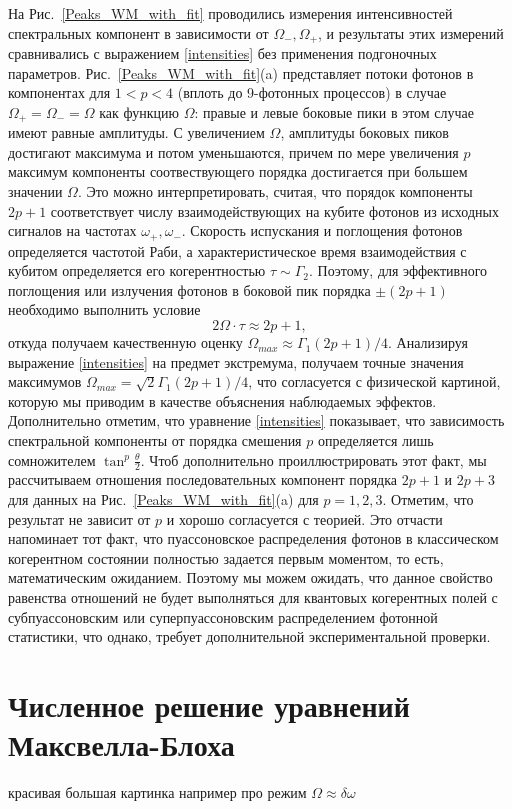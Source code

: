 На Рис.~\ref{Peaks_WM_with_fit} проводились измерения интенсивностей спектральных компонент в зависимости от $\Omega_-, \Omega_+$, и результаты этих измерений сравнивались с выражением \eqref{intensities} без применения подгоночных параметров. Рис.~\ref{Peaks_WM_with_fit}(a) представляет потоки фотонов в компонентах для  $1< p < 4$ (вплоть до 9-фотонных процессов) в случае $\Omega_+\!=\!\Omega_-\!=\!\Omega$ как функцию $\Omega$: правые и левые боковые пики в этом случае имеют равные амплитуды. С увеличением $\Omega$, амплитуды боковых пиков достигают максимума и потом уменьшаются, причем по мере увеличения $p$ максимум компоненты соотвествующего порядка достигается при большем значении $\Omega$. Это можно интерпретировать, считая, что порядок компоненты $2p + 1$ соответствует числу взаимодействующих на кубите фотонов из исходных сигналов на частотах $\omega_+, \omega_-$. Скорость испускания и поглощения фотонов определяется частотой Раби, а характеристическое время взаимодействия с кубитом определяется его когерентностью $\tau \sim \Gamma_2$. Поэтому, для эффективного поглощения или излучения фотонов в боковой пик порядка $\pm(2p+1)$ необходимо выполнить условие
\begin{equation}
2\Omega\cdot \tau \approx 2p+1,
\end{equation}
откуда получаем качественную оценку $\Omega_{max} \approx \Gamma_1(2p+1)/4$. Анализируя выражение \eqref{intensities} на предмет экстремума, получаем точные значения максимумов $\Omega_{max} = \sqrt{2} \Gamma_1(2p+1)/4$, что согласуется с физической картиной, которую мы приводим в качестве объяснения наблюдаемых эффектов. Дополнительно отметим, что уравнение \eqref{intensities} показывает, что зависимость спектральной компоненты от порядка смешения $p$ определяется лишь сомножителем $\tan^p\frac{\theta}{2}$. Чтоб дополнительно проиллюстрировать этот факт, мы рассчитываем отношения последовательных компонент порядка $2p+1$ и $2p+3$ для данных на Рис.~\ref{Peaks_WM_with_fit}(a) для $p=1,2,3$. Отметим, что результат не зависит от $p$ и хорошо согласуется с теорией. Это отчасти напоминает тот факт, что пуассоновское распределения фотонов в классическом когерентном состоянии полностью задается первым моментом, то есть, математическим ожиданием. Поэтому мы можем ожидать, что данное свойство равенства отношений не будет выполняться для квантовых когерентных полей с субпуассоновским или суперпуассоновским распределением фотонной статистики, что однако, требует дополнительной экспериментальной проверки.    

\section{Численное решение уравнений Максвелла-Блоха}
красивая большая картинка например про режим $\Omega \approx \delta \omega$
